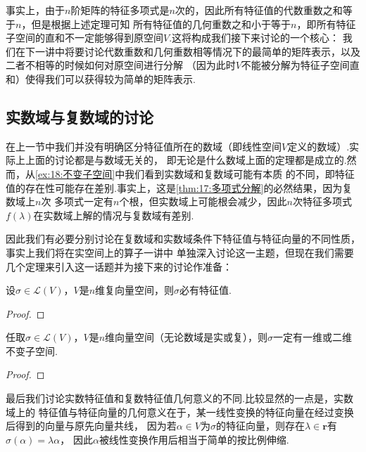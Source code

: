 事实上，由于$n$阶矩阵的特征多项式是$n$次的，因此所有特征值的代数重数之和等于$n$，但是根据上述定理可知
所有特征值的几何重数之和小于等于$n$，即所有特征子空间的直和不一定能够得到原空间$V$.这将构成我们接下来讨论的一个核心：
我们在下一讲中将要讨论代数重数和几何重数相等情况下的最简单的矩阵表示，以及二者不相等的时候如何对原空间进行分解
（因为此时$V$不能被分解为特征子空间直和）使得我们可以获得较为简单的矩阵表示.

\subsection{实数域与复数域的讨论}
在上一节中我们并没有明确区分特征值所在的数域（即线性空间$V$定义的数域）.实际上上面的讨论都是与数域无关的，
即无论是什么数域上面的定理都是成立的.然而，从\autoref{ex:18:不变子空间}中我们看到实数域和复数域可能有本质
的不同，即特征值的存在性可能存在差别.事实上，这是\autoref{thm:17:多项式分解}的必然结果，因为复数域上$n$次
多项式一定有$n$个根，但实数域上可能根会减少，因此$n$次特征多项式$f(\lambda)$在实数域上解的情况与复数域有差别.

因此我们有必要分别讨论在复数域和实数域条件下特征值与特征向量的不同性质，事实上我们将在实空间上的算子一讲中
单独深入讨论这一主题，但现在我们需要几个定理来引入这一话题并为接下来的讨论作准备：
\begin{theorem}\label{thm:18:复数域上的特征值}
    设$\sigma\in \mathcal{L}(V)$，$V$是$n$维复向量空间，则$\sigma$必有特征值.
\end{theorem}
\begin{proof}
    
\end{proof}

\begin{theorem}\label{thm:18:特征值与不变子空间}
    任取$\sigma\in \mathcal{L}(V)$，$V$是$n$维向量空间（无论数域是实或复），则$\sigma$一定有一维或二维不变子空间.
\end{theorem}
\begin{proof}
    
\end{proof}

最后我们讨论实数特征值和复数特征值几何意义的不同.比较显然的一点是，实数域上的
特征值与特征向量的几何意义在于，某一线性变换的特征向量在经过变换后得到的向量与原先向量共线，
因为若$\alpha\in V$为$\sigma$的特征向量，则存在$\lambda\in\mathbf{r}$有$\sigma(\alpha)=\lambda\alpha$，
因此$\alpha$被线性变换作用后相当于简单的按比例伸缩.

